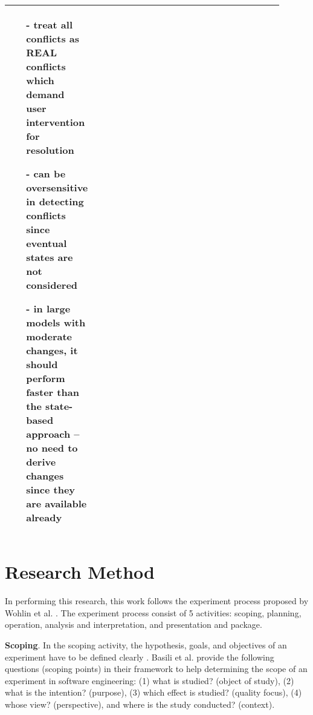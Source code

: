 \begin{table}[]
\begin{tabular}{|p{0.14\linewidth}|p{0.38\linewidth}|p{0.38\linewidth}|}
\begin{minipage}[t]{\linewidth}
      \raggedright
    \begin{itemize}[leftmargin=9pt]
      \setlength\itemsep{2pt}
      \item[-] treat all conflicts as \textsf{REAL} conflicts which demand user intervention for resolution
      \item[-] can be oversensitive in detecting conflicts since eventual states are not considered
      \item[-] in large models with moderate changes, it should perform faster than the state-based approach -- no need to derive changes since they are available already 
      \item[]
    \end{itemize} 
  \end{minipage}
    \\
    \hline                         
  \end{tabular}
\end{table}

\section{Research Method}
\label{sec:research_method}
In performing this research, this work follows the experiment process proposed by Wohlin et al. \cite{DBLP:books/daglib/0029933/Wohlin}. The experiment process consist of 5 activities: scoping, planning, operation, analysis and interpretation, and presentation and package.

\textbf{Scoping}. In the scoping activity, the hypothesis, goals, and objectives of an experiment have to be defined clearly \cite{DBLP:books/daglib/0029933/Wohlin}. Basili et al. \cite{basili1988tame} provide the following questions (scoping points) in their framework to help determining the scope of an experiment in software engineering: (1) what is studied? (object of study), (2) what is the intention? (purpose), (3) which effect is studied? (quality focus), (4) whose view? (perspective), and where is the study conducted? (context).


